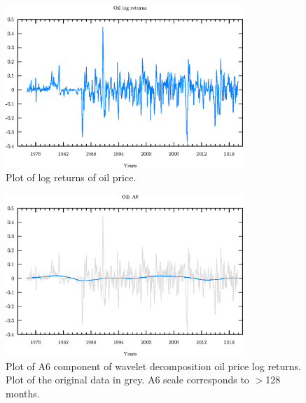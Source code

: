 \begin{figure}
\begin{center}
\includegraphics[width=0.8\textwidth]{./code/plot/oil_logret.eps}
\caption{Plot of log returns of oil price.}
\label{fig:oil-logret}
\end{center}
\end{figure}

\begin{figure}
\begin{center}
\includegraphics[width=0.8\textwidth]{./code/plot/oil_wr_A6.eps}
\caption{Plot of A6 component of wavelet decomposition oil price  log returns. 
	Plot of the original data in grey. A6 scale corresponds to $>$128 months.}
\label{fig:oil-wr-a6}
\end{center}
\end{figure}

